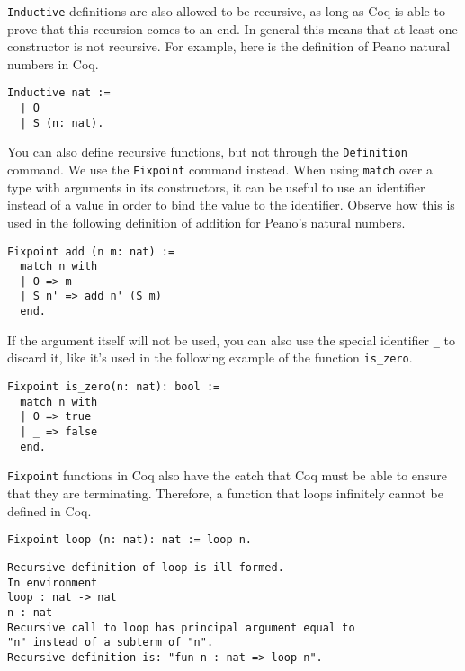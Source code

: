 \texttt{Inductive} definitions are also allowed to be recursive, as long as Coq is able to 
prove that this recursion comes to an end. In general this means that at least one constructor is not 
recursive. For example, here is the definition of Peano natural numbers in Coq.

\begin{verbatim}
Inductive nat :=
  | O 
  | S (n: nat).
\end{verbatim}

You can also define recursive functions, but not through the \texttt{Definition} command. We 
use the \texttt{Fixpoint} command instead. When using \texttt{match} over a type 
with arguments in its constructors, it can be useful to use an identifier instead of a value in order 
to bind the value to the identifier. Observe how this is used in the following definition of addition
for Peano's natural numbers.

\begin{verbatim}
Fixpoint add (n m: nat) :=
  match n with
  | O => m
  | S n' => add n' (S m)
  end.
\end{verbatim}

If the argument itself will not be used, you can also use the special
identifier \texttt{_} to discard it, like it's used in the following example 
of the function \texttt{is_zero}.

\begin{verbatim}
Fixpoint is_zero(n: nat): bool :=
  match n with
  | O => true
  | _ => false
  end.
\end{verbatim}


\texttt{Fixpoint} functions in Coq also have the catch that Coq must be able to ensure that
they are terminating. Therefore, a function that loops infinitely cannot be defined in Coq. 

\begin{verbatim}
Fixpoint loop (n: nat): nat := loop n.
\end{verbatim}
\vspace{-\baselineskip*3/2}
\begin{verbatim}
Recursive definition of loop is ill-formed.
In environment
loop : nat -> nat
n : nat
Recursive call to loop has principal argument equal to 
"n" instead of a subterm of "n".
Recursive definition is: "fun n : nat => loop n".
\end{verbatim}

